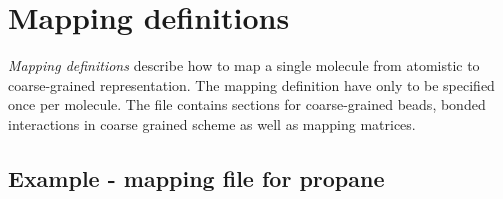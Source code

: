 \section{Mapping definitions}
{\em Mapping definitions} describe how to map a single molecule from atomistic to coarse-grained representation. The mapping definition have only to be specified once per molecule. The file contains sections for coarse-grained beads, bonded interactions in coarse grained scheme as well as mapping matrices. 

\subsection{Example - mapping file for propane}


